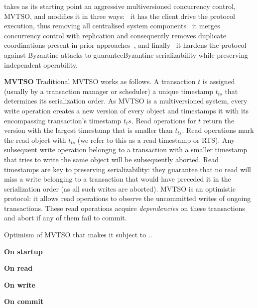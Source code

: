 \sys{} takes as its starting point an aggressive multiversioned concurrency control,
MVTSO, and modifies it in three ways: \one~it has the client drive the protocol execution,
thus removing all centralised system components \two~it merges concurrency control
with replication and consequently removes duplicate coordinations present in prior approaches~\cite{}, and finally \three~it hardens the protocol against Byzantine attacks to guaranteeByzantine serializability while preserving independent operability.

\par \textbf{MVTSO} Traditional MVTSO works as follows. A transaction $t$ is assigned (usually by a transaction manager or scheduler) a unique timestamp $t_{ts}$ that determines its serialization order. As MVTSO is a multiversioned system, every write operation creates a new version of every object and timestamps it with its encompassing transaction's timestamp $t_ts$. Read operations for $t$ return the version with the largest timestamp that is smaller than $t_{ts}$. Read operations mark the read object with $t_{ts}$ (we refer to this as a read timestamp or RTS). Any subsequent write operation belongng to a transaction with a smaller timestamp that tries to write the same object will be subsequently aborted. Read timestamps are key to preserving serializability: they guarantee that no read will miss a write belonging to a transaction that would have preceded it in the serialization order (as all such writes are aborted). MVTSO is an optimistic protocol: it allows read operations to observe the uncommitted writes of ongoing transactions. These read operations acquire \textit{dependencies} on these transactions and abort if any of them fail to commit.   

Optimism of  MVTSO that makes it subject to ..

\par \textbf{On startup}


\par \textbf{On read}

\par \textbf{On write}

\par \textbf{On commit}
